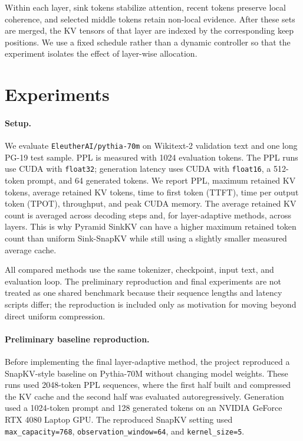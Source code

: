 \documentclass{article}
\begin{document}
Within each layer, sink tokens stabilize attention, recent tokens preserve local
coherence, and selected middle tokens retain non-local evidence. After these
sets are merged, the KV tensors of that layer are indexed by the corresponding
keep positions. We use a fixed schedule rather than a dynamic controller so that
the experiment isolates the effect of layer-wise allocation.

\section{Experiments}
\label{sec:experiments}

\paragraph{Setup.}
We evaluate \texttt{EleutherAI/pythia-70m} on Wikitext-2 validation text and one
long PG-19 test sample. PPL is measured with 1024 evaluation tokens. The PPL
runs use CUDA with \texttt{float32}; generation latency uses CUDA with
\texttt{float16}, a 512-token prompt, and 64 generated tokens. We report PPL,
maximum retained KV tokens, average retained KV tokens, time to first token
(TTFT), time per output token (TPOT), throughput, and peak CUDA memory. The
average retained KV count is averaged across decoding steps and, for
layer-adaptive methods, across layers. This is why Pyramid SinkKV can have a
higher maximum retained token count than uniform Sink-SnapKV while still using a
slightly smaller measured average cache.

All compared methods use the same tokenizer, checkpoint, input text, and
evaluation loop. The preliminary reproduction and final experiments are not
treated as one shared benchmark because their sequence lengths and latency
scripts differ; the reproduction is included only as motivation for moving
beyond direct uniform compression.

\paragraph{Preliminary baseline reproduction.}
Before implementing the final layer-adaptive method, the project reproduced a
SnapKV-style baseline on Pythia-70M without changing model weights. These runs
used 2048-token PPL sequences, where the first half built and compressed the KV
cache and the second half was evaluated autoregressively. Generation used a
1024-token prompt and 128 generated tokens on an NVIDIA GeForce RTX 4080 Laptop
GPU. The reproduced SnapKV setting used \texttt{max\_capacity=768},
\texttt{observation\_window=64}, and \texttt{kernel\_size=5}.
\end{document}
